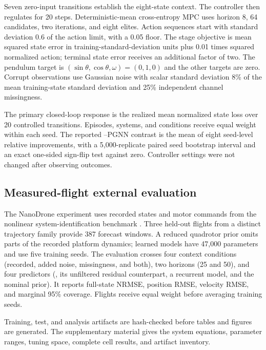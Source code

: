 Seven zero-input transitions establish the eight-state context. The controller
then regulates for 20 steps. Deterministic-mean cross-entropy MPC uses horizon
8, 64 candidates, two iterations, and eight elites. Action sequences start
with standard deviation 0.6 of the action limit, with a 0.05 floor. The stage
objective is mean squared state error in training-standard-deviation units plus
0.01 times squared normalized action; terminal state error receives an
additional factor of two. The pendulum target is
$(\sin\theta,\cos\theta,\omega)=(0,1,0)$ and the other targets are zero.
Corrupt observations use Gaussian noise with scalar standard deviation 8\% of
the mean training-state standard deviation and 25\% independent channel
missingness.

The primary closed-loop response is the realized mean normalized state loss
over 20 controlled transitions. Episodes, systems, and conditions receive
equal weight within each seed. The reported \method{}--PGNN contrast is the
mean of eight seed-level relative improvements, with a 5,000-replicate paired
seed bootstrap interval and an exact one-sided sign-flip test against zero.
Controller settings were not changed after observing outcomes.

\subsection{Measured-flight external evaluation}

The NanoDrone experiment uses recorded states and motor commands from the
nonlinear system-identification benchmark \cite{busetto2026_nanodrone}. Three
held-out flights from a distinct trajectory family provide 387 forecast
windows. A reduced quadrotor prior omits parts of the recorded platform
dynamics; learned models have 47,000 parameters and use five training seeds.
The evaluation crosses four context conditions (recorded, added noise,
missingness, and both), two horizons (25 and 50), and four predictors
(\method, its unfiltered residual counterpart, a recurrent model, and the
nominal prior). It reports full-state NRMSE, position RMSE, velocity RMSE, and
marginal 95\% coverage. Flights receive equal weight before averaging training
seeds.

Training, test, and analysis artifacts are hash-checked before tables and
figures are generated. The supplementary material gives the system equations,
parameter ranges, tuning space, complete cell results, and artifact inventory.


